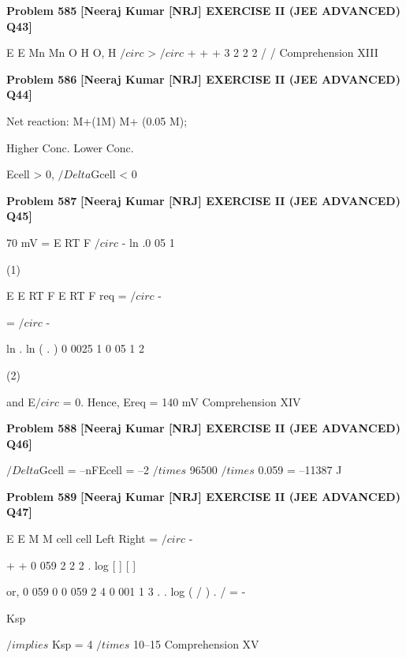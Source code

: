 \begin{problembox}
\textbf{Problem 585} \hfill \textbf{[Neeraj Kumar [NRJ] EXERCISE II (JEE ADVANCED) Q43]}
\label{q:ext-nrj_all_questions-585}

E
E
Mn
Mn
O
H O, H
$/circ$
>
$/circ$
+
+
+
3
2
2
2
/
/
Comprehension XIII
\end{problembox}

\begin{problembox}
\textbf{Problem 586} \hfill \textbf{[Neeraj Kumar [NRJ] EXERCISE II (JEE ADVANCED) Q44]}
\label{q:ext-nrj_all_questions-586}

Net reaction: M+(1M) 
 M+ (0.05 M); 
 
                       Higher Conc.      Lower Conc.
 
 Ecell > 0, $/Delta$Gcell < 0
\end{problembox}

\begin{problembox}
\textbf{Problem 587} \hfill \textbf{[Neeraj Kumar [NRJ] EXERCISE II (JEE ADVANCED) Q45]}
\label{q:ext-nrj_all_questions-587}

70 mV = E
RT
F
$/circ$ -
 ln .0 05
1
 
(1)
 
 
E
E
RT
F
E
RT
F
req =
$/circ$ -
 
=
$/circ$ -
 
ln .
ln ( .
)
0 0025
1
0 05
1
2
 
 
(2)
 
 and E$/circ$ = 0.  Hence, Ereq = 140 mV
Comprehension XIV
\end{problembox}

\begin{problembox}
\textbf{Problem 588} \hfill \textbf{[Neeraj Kumar [NRJ] EXERCISE II (JEE ADVANCED) Q46]}
\label{q:ext-nrj_all_questions-588}

$/Delta$Gcell = --nFEcell = --2 $/times$ 96500 $/times$ 0.059 = --11387 J
\end{problembox}

\begin{problembox}
\textbf{Problem 589} \hfill \textbf{[Neeraj Kumar [NRJ] EXERCISE II (JEE ADVANCED) Q47]}
\label{q:ext-nrj_all_questions-589}

E
E
M
M
cell
cell
Left
Right
=
$/circ$
-
 
+
+
0 059
2
2
2
.
log [
]
[
]
 
 or, 0 059
0
0 059
2
4
0 001
1 3
.
.
log
(
/ )
.
/
=
-
 
Ksp
 
 
 $/implies$ Ksp = 4 $/times$ 10--15
Comprehension XV
\end{problembox}

